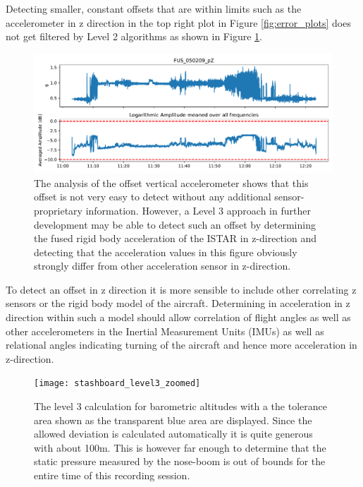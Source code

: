 Detecting smaller, constant offsets that are within limits such as the accelerometer in z direction in the top right plot in Figure \ref{fig:error_plots} does not get filtered by Level 2 algorithms as shown in Figure \ref{fig:results_050209}.
\begin{figure}
    \centering
    \includegraphics[width=\textwidth]{03_figures/python_functions/images/FUS_050209}
    \caption[Analysis of the offset vertical accelerometer]{The analysis of the offset vertical accelerometer shows that this offset is not very easy to detect without any additional sensor-proprietary information. However, a Level 3 approach in further development may be able to detect such an offset by determining the fused rigid body acceleration of the ISTAR in z-direction and detecting that the acceleration values in this figure obviously strongly differ from other acceleration sensor in z-direction.}
    \label{fig:results_050209}
\end{figure}

To detect an offset in z direction it is more sensible to include other correlating z sensors or the rigid body model of the aircraft. Determining in acceleration in z direction within such a model should allow correlation of flight angles as well as other accelerometers in the Inertial Measurement Units (IMUs) as well as relational angles indicating turning of the aircraft and hence more acceleration in z-direction.
\begin{figure}
    \centering
    \texttt{[image: stashboard\_level3\_zoomed]}
    \caption[Level 3 SHM for the altitude-dependent parameters.]{The level 3 calculation for barometric altitudes with a the tolerance area shown as the transparent blue area are displayed. Since the allowed deviation is calculated automatically it is quite generous with about 100m. This is however far enough to determine that the static pressure measured by the nose-boom is out of bounds for the entire time of this recording session.}
    \label{fig:stashboard_level3_zoomed}
\end{figure}

